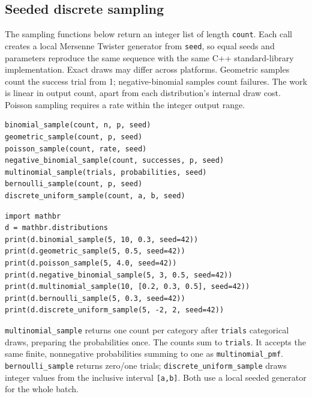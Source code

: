 \documentclass[11pt,a4paper]{article}
\begin{document}
\subsection{Seeded discrete sampling}
The sampling functions below return an integer list of length \verb|count|. Each call creates a local Mersenne Twister generator from \verb|seed|, so equal seeds and parameters reproduce the same sequence with the same C++ standard-library implementation. Exact draws may differ across platforms. Geometric samples count the success trial from 1; negative-binomial samples count failures. The work is linear in output count, apart from each distribution's internal draw cost. Poisson sampling requires a rate within the integer output range.
\begin{verbatim}
binomial_sample(count, n, p, seed)
geometric_sample(count, p, seed)
poisson_sample(count, rate, seed)
negative_binomial_sample(count, successes, p, seed)
multinomial_sample(trials, probabilities, seed)
bernoulli_sample(count, p, seed)
discrete_uniform_sample(count, a, b, seed)
\end{verbatim}
\begin{verbatim}
import mathbr
d = mathbr.distributions
print(d.binomial_sample(5, 10, 0.3, seed=42))
print(d.geometric_sample(5, 0.5, seed=42))
print(d.poisson_sample(5, 4.0, seed=42))
print(d.negative_binomial_sample(5, 3, 0.5, seed=42))
print(d.multinomial_sample(10, [0.2, 0.3, 0.5], seed=42))
print(d.bernoulli_sample(5, 0.3, seed=42))
print(d.discrete_uniform_sample(5, -2, 2, seed=42))
\end{verbatim}
\verb|multinomial_sample| returns one count per category after \verb|trials| categorical draws, preparing the probabilities once. The counts sum to \verb|trials|. It accepts the same finite, nonnegative probabilities summing to one as \verb|multinomial_pmf|.
\verb|bernoulli_sample| returns zero/one trials; \verb|discrete_uniform_sample| draws integer values from the inclusive interval \verb|[a,b]|. Both use a local seeded generator for the whole batch.
\end{document}
